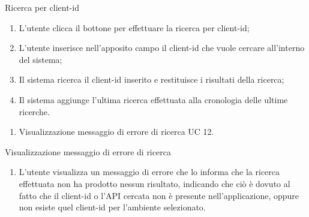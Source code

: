 \begin{usecase}{11}{Ricerca per client-id}\label{uc:ricerca-client-id}

    \usecasemain{}
        \begin{enumerate}
            \item L'utente clicca il bottone per effettuare la ricerca per client-id;
            \item L'utente inserisce nell'apposito campo il client-id che vuole cercare all'interno del sistema;
            \item Il sistema ricerca il client-id inserito e restituisce i risultati della ricerca;
            \item Il sistema aggiunge l'ultima ricerca effettuata alla cronologia delle ultime ricerche.
        \end{enumerate}

    \usecaseext{}
        \begin{enumerate}
            \item Visualizzazione messaggio di errore di ricerca UC 12.
        \end{enumerate}

\end{usecase}


\begin{usecase}{12}{Visualizzazione messaggio di errore di ricerca}\label{uc:visualizzazione-errore-ricerca}

    \usecasemain{}
        \begin{enumerate}
            \item L'utente visualizza un messaggio di errore che lo informa che la ricerca effettuata non ha prodotto nessun risultato, indicando che ciò è dovuto al fatto
            che il client-id o l'API cercata non è presente nell'applicazione, oppure non esiste quel client-id per l'ambiente selezionato.
        \end{enumerate}

\end{usecase}


